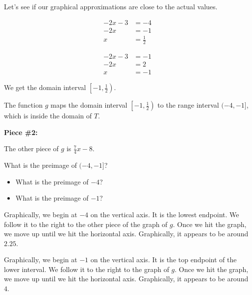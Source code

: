 \documentclass{ximera}
\begin{document}
Let's see if our graphical approximations are close to the actual values.



\begin{align*}
-2x-3 & = -4 \\
-2x   & = -1   \\
x     & = \frac{1}{2}
\end{align*}

\begin{align*}
-2x-3 & = -1 \\
-2x   & = 2   \\
x     & = -1
\end{align*} 


We get the domain interval $\left[ -1, \frac{1}{2} \right)$.


The function $g$ maps the domain interval $\left[ -1, \frac{1}{2} \right)$ to the range interval $(-4, -1]$, which is inside the domain of $T$.





\textbf{Piece \#2:}


The other piece of $g$ is $\frac{7}{4}x - 8$. 


What is the preimage of $(-4, -1]$?


\begin{itemize}
\item What is the preimage of $-4$? 
\item What is the preimage of $-1$? 
\end{itemize}



Graphically, we begin at $-4$ on the vertical axis.  It is the lowest endpoint.  We follow it to the right to the other piece of the graph of $g$.  Once we hit the graph, we move up until we hit the horizontal axis.  Graphically, it appears to be around $2.25$.


Graphically, we begin at $-1$ on the vertical axis.  It is the top endpoint of the lower interval.  We follow it to the right to the graph of $g$.  Once we hit the graph, we move up until we hit the horizontal axis.  Graphically, it appears to be around $4$.
\end{document}
